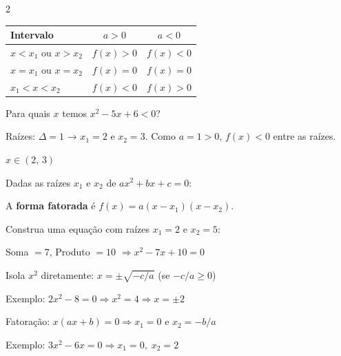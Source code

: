 \documentclass[12pt]{article}
\begin{document}
\begin{multicols}{2}
\vspace{0.2cm}
\begin{center}
\begin{tabular}{|l|c|c|}
\hline
Intervalo & $a > 0$ & $a < 0$ \\
\hline
$x < x_1$ ou $x > x_2$ & $f(x) > 0$ & $f(x) < 0$ \\
$x = x_1$ ou $x = x_2$ & $f(x) = 0$ & $f(x) = 0$ \\
$x_1 < x < x_2$ & $f(x) < 0$ & $f(x) > 0$ \\
\hline
\end{tabular}
\end{center}
\vspace{0.2cm}


Para quais $x$ temos $x^2-5x+6 < 0$?

Raízes: $\Delta=1$ → $x_1=2$ e $x_2=3$. Como $a=1>0$, $f(x)<0$ entre as raízes.

$\boxed{x \in (2,\,3)}$


Dadas as raízes $x_1$ e $x_2$ de $ax^2+bx+c=0$:


A \textbf{forma fatorada} é $f(x) = a(x-x_1)(x-x_2)$.


Construa uma equação com raízes $x_1=2$ e $x_2=5$:

Soma $= 7$, Produto $= 10$ $\Rightarrow \boxed{x^2 - 7x + 10 = 0}$



Isola $x^2$ diretamente: $x = \pm\sqrt{-c/a}$ (se $-c/a \geq 0$)

Exemplo: $2x^2 - 8 = 0 \Rightarrow x^2 = 4 \Rightarrow x = \pm 2$


Fatoração: $x(ax+b) = 0 \Rightarrow x_1 = 0$ e $x_2 = -b/a$

Exemplo: $3x^2 - 6x = 0 \Rightarrow x_1 = 0,\; x_2 = 2$

\vspace{0.2cm}


\end{multicols}
\end{document}
